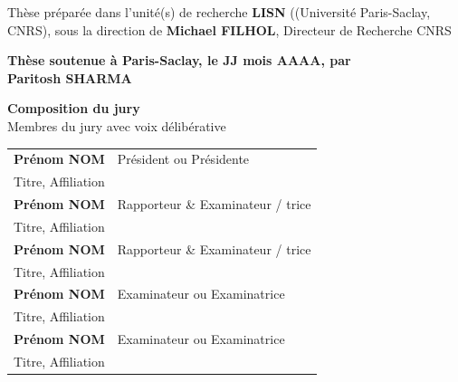 \documentclass[english,12pt,a4paper]{book}
\begin{document}
\begin{titlepage}
\footnotesize Thèse préparée dans l'unité(s) de recherche \textbf{LISN} ((Université Paris-Saclay, CNRS), sous la direction de \textbf{Michael FILHOL}, Directeur de Recherche CNRS \\
\vspace{15mm}

\textbf{Thèse soutenue à Paris-Saclay, le JJ mois AAAA, par}\\
\bigskip
\Large {\color{Prune} \textbf{Paritosh SHARMA}} %

\vspace{\fill} %

\bigskip

\flushleft
\small {\color{Prune} \textbf{Composition du jury}}\\
{\color{Prune} \scriptsize {Membres du jury avec voix délibérative}} \\
\vspace{2mm}
\scriptsize
\begin{tabular}{|p{7cm}l}
\arrayrulecolor{Prune}
\textbf{Prénom NOM} &   Président ou Présidente\\ 
Titre, Affiliation & \\
\textbf{Prénom NOM} &  Rapporteur \& Examinateur / trice \\ 
Titre, Affiliation   &   \\ 
\textbf{Prénom NOM} &  Rapporteur \& Examinateur / trice \\ 
Titre, Affiliation  &   \\ 
\textbf{Prénom NOM} &  Examinateur ou Examinatrice \\ 
Titre, Affiliation   &   \\ 
\textbf{Prénom NOM} &  Examinateur ou Examinatrice \\ 
Titre, Affiliation   &   \\ 
 

\end{tabular} 

\end{titlepage}


\thispagestyle{empty}
\selectfont

\lhead{}
\rhead{}
\rfoot{}
\cfoot{}
\lfoot{}
\end{document}
